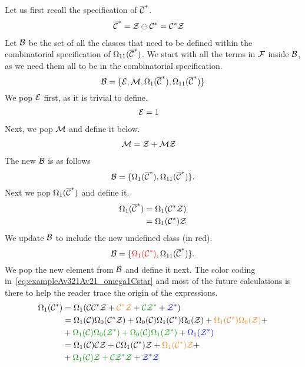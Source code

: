 \documentclass[12pt, a4paper, twoside]{report}
\begin{document}
Let us first recall the specification of $\overline{\mathcal{C}}^*$.
\begin{align*}
  \overline{\mathcal{C}}^* &= \mathcal{Z} \ominus \mathcal{C}^* = \mathcal{C}^*\mathcal{Z}
\end{align*}
Let $\mathcal{B}$ be the set of all the classes that need to be defined within the combinatorial specification of $\Omega_{11}(\overline{\mathcal{C}}^*)$. We start with all the terms in $\mathcal{F}$ inside $\mathcal{B}$, as we need them all to be in the combinatorial specification.
$$\mathcal{B} = \{\mathcal{E}, \mathcal{M}, \Omega_1(\overline{\mathcal{C}}^*), \Omega_{11}(\overline{\mathcal{C}}^*)\}$$
We pop $\mathcal{E}$ first, as it is trivial to define.
\begin{align}
  \mathcal{E} &= 1
        \label{eq:exampleAv321Av21_E}
\end{align}
Next, we pop $\mathcal{M}$ and define it below.
\begin{align}
  \mathcal{M} &= \mathcal{Z} + \mathcal{M}\mathcal{Z}
       \label{eq:exampleAv321Av21_M}
\end{align}
The new $\mathcal{B}$ is as follows
$$\mathcal{B} = \{\Omega_1(\overline{\mathcal{C}}^*), \Omega_{11}(\overline{\mathcal{C}}^*)\}.$$
Next we pop $\Omega_1(\overline{\mathcal{C}}^*)$ and define it.
\begin{align}
  \begin{aligned}
    \Omega_1(\overline{\mathcal{C}}^*) &= \Omega_1(\mathcal{C}^*\mathcal{Z})\\
    &= \Omega_1(\mathcal{C}^*)\mathcal{Z}
  \end{aligned}
  \label{eq:exampleAv321Av21_omega1barCstar}
\end{align}
We update $\mathcal{B}$ to include the new undefined class (in red).
$$\mathcal{B} = \{\textcolor{red}{\Omega_1(\mathcal{C}^*)}, \Omega_{11}(\overline{\mathcal{C}}^*)\}.$$
We pop the new element from $\mathcal{B}$ and define it next. The color coding in~\eqref{eq:exampleAv321Av21_omega1Cstar} and most of the future calculations is there to help the reader trace the origin of the expressions.
\begin{align}
  \begin{aligned}
    \Omega_1(\Cstar) &= \Omega_1(\C\Cstar\Z + \textcolor{orange}{\Cstar\Z} + \textcolor{green}{\C\Z^*} + \textcolor{blue}{\Z^*})\\
    &= \Omega_1(\C)\Omega_0(\Cstar\Z) + \Omega_0(\C)\Omega_1(\Cstar)\Omega_0(\Z) + \textcolor{orange}{\Omega_1(\Cstar)\Omega_0(\Z)} +\\
    &+\textcolor{green}{\Omega_1(\C)\Omega_0(\Z^*) + \Omega_0(\C)\Omega_1(\Z^*)} + \textcolor{blue}{\Omega_1(\Zstar)}\\
    &= \Omega_1(\C)\C\Z + \C\Omega_1(\Cstar)\Z + \textcolor{orange}{\Omega_1(\Cstar)\Z} +\\
    &+\textcolor{green}{\Omega_1(\C)\Z + \C\Z^*\Z} + \textcolor{blue}{\Zstar\Z}
  \end{aligned}
  \label{eq:exampleAv321Av21_omega1Cstar}
\end{align}
\end{document}
